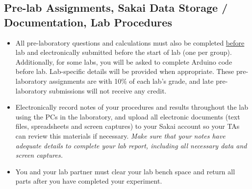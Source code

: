 \subsection{Pre-lab Assignments, Sakai Data Storage / Documentation, Lab Procedures}
\begin{itemize}
    \item All pre-laboratory questions and calculations must also be completed
        \underline{before} lab and electronically submitted before the start of
        lab (one per group). Additionally, for some labs, you will be asked to
        complete Arduino code before lab.  Lab-specific details will be
        provided when appropriate.  These pre-laboratory assignments are with
        10\% of each lab's grade, and late pre-laboratory submissions will not
        receive any credit.
    \item Electronically record notes of your procedures and results throughout
        the lab using the PCs in the laboratory, and upload all electronic
        documents (text files, spreadsheets and screen captures) to your Sakai
        account so your TAs can review this materials if necessary.  \emph{Make
            sure that your notes have adequate details to complete your lab
            report, including all necessary data and screen captures.}
    \item You and your lab partner must clear your lab bench space and
        return all parts after you have completed your experiment.  
\end{itemize}

